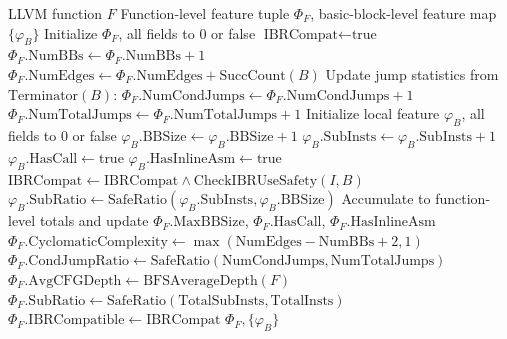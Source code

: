 \documentclass[pdflatex,sn-mathphys-num]{sn-jnl}
\theoremstyle{thmstyleone}%
\theoremstyle{thmstyletwo}%
\theoremstyle{thmstylethree}%
\begin{document}
\begin{algorithm}[!t]
\footnotesize
\caption{MIXCOMPILE Feature Collection (FeatureCollection)}
\label{alg:feature}
\begin{algorithmic}[1]
    \Require LLVM function $F$
    \Ensure Function-level feature tuple $\Phi_F$, basic-block-level feature map $\{\varphi_B\}$
    \State Initialize $\Phi_F$, all fields to 0 or false
    \State $\text{IBRCompat} \gets \text{true}$
        \State $\Phi_F.\text{NumBBs} \gets \Phi_F.\text{NumBBs} + 1$
        \State $\Phi_F.\text{NumEdges} \gets \Phi_F.\text{NumEdges} + \text{SuccCount}(B)$
        \State Update jump statistics from $\text{Terminator}(B)$:
         \State $\Phi_F.\text{NumCondJumps} \gets \Phi_F.\text{NumCondJumps} + 1$ \EndIf
         \State $\Phi_F.\text{NumTotalJumps} \gets \Phi_F.\text{NumTotalJumps} + 1$ \EndIf
        \State Initialize local feature $\varphi_B$, all fields to 0 or false
            \State $\varphi_B.\text{BBSize} \gets \varphi_B.\text{BBSize} + 1$
             \State $\varphi_B.\text{SubInsts} \gets \varphi_B.\text{SubInsts} + 1$ \EndIf
                \State $\varphi_B.\text{HasCall} \gets \text{true}$
                 \State $\varphi_B.\text{HasInlineAsm} \gets \text{true}$ \EndIf
            \EndIf
                \State $\text{IBRCompat} \gets \text{IBRCompat} \land \text{CheckIBRUseSafety}(I, B)$
            \EndIf
        \EndFor
        \State $\varphi_B.\text{SubRatio} \gets \text{SafeRatio}(\varphi_B.\text{SubInsts}, \varphi_B.\text{BBSize})$
        \State Accumulate to function-level totals and update $\Phi_F.\text{MaxBBSize}$,
               $\Phi_F.\text{HasCall}$, $\Phi_F.\text{HasInlineAsm}$
    \EndFor
    \State $\Phi_F.\text{CyclomaticComplexity} \gets \max(\text{NumEdges} - \text{NumBBs} + 2, 1)$
    \State $\Phi_F.\text{CondJumpRatio} \gets \text{SafeRatio}(\text{NumCondJumps}, \text{NumTotalJumps})$
    \State $\Phi_F.\text{AvgCFGDepth} \gets \text{BFSAverageDepth}(F)$
    \State $\Phi_F.\text{SubRatio} \gets \text{SafeRatio}(\text{TotalSubInsts}, \text{TotalInsts})$
    \State $\Phi_F.\text{IBRCompatible} \gets \text{IBRCompat}$
    \Return $\Phi_F, \{\varphi_B\}$
\end{algorithmic}
\end{algorithm}
\end{document}
